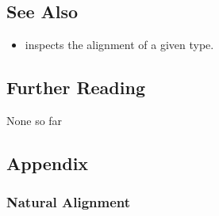\subsection[See Also]{See Also}\label{see-also}

\begin{itemize}
\item{%
inspects the alignment of a given type.}
\end{itemize}

\subsection[Further Reading]{Further Reading}\label{further-reading}

None so far

\subsection[Appendix]{Appendix}\label{alignas-appendix}

\subsubsection[Natural Alignment]{Natural Alignment}\label{natural-alignment}

%

